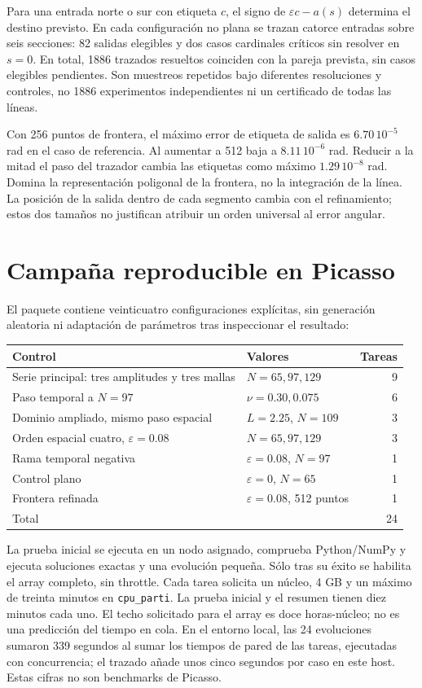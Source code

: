 \documentclass[11pt,a4paper]{article}
\newcommand{\eps}{\varepsilon}
\begin{document}
Para una entrada norte o sur con etiqueta $c$, el signo de $\eps c-a(s)$ determina el destino previsto. En cada configuración no plana se trazan catorce entradas sobre seis secciones: 82 salidas elegibles y dos casos cardinales críticos sin resolver en $s=0$. En total, 1886 trazados resueltos coinciden con la pareja prevista, sin casos elegibles pendientes. Son muestreos repetidos bajo diferentes resoluciones y controles, no 1886 experimentos independientes ni un certificado de todas las líneas.

Con 256 puntos de frontera, el máximo error de etiqueta de salida es $6.70\,10^{-5}$ rad en el caso de referencia. Al aumentar a 512 baja a $8.11\,10^{-6}$ rad. Reducir a la mitad el paso del trazador cambia las etiquetas como máximo $1.29\,10^{-8}$ rad. Domina la representación poligonal de la frontera, no la integración de la línea. La posición de la salida dentro de cada segmento cambia con el refinamiento; estos dos tamaños no justifican atribuir un orden universal al error angular.

\section{Campaña reproducible en Picasso}
El paquete contiene veinticuatro configuraciones explícitas, sin generación aleatoria ni adaptación de parámetros tras inspeccionar el resultado:
\begin{center}
\small\begin{tabular}{@{}p{.48\linewidth}p{.33\linewidth}r@{}}
\toprule
Control & Valores & Tareas\\
\midrule
Serie principal: tres amplitudes y tres mallas & $N=65,97,129$ & 9\\
Paso temporal a $N=97$ & $\nu=0.30,0.075$ & 6\\
Dominio ampliado, mismo paso espacial & $L=2.25$, $N=109$ & 3\\
Orden espacial cuatro, $\eps=0.08$ & $N=65,97,129$ & 3\\
Rama temporal negativa & $\eps=0.08$, $N=97$ & 1\\
Control plano & $\eps=0$, $N=65$ & 1\\
Frontera refinada & $\eps=0.08$, 512 puntos & 1\\
\midrule
Total & & 24\\
\bottomrule
\end{tabular}
\end{center}
La prueba inicial se ejecuta en un nodo asignado, comprueba Python/NumPy y ejecuta soluciones exactas y una evolución pequeña. Sólo tras su éxito se habilita el array completo, sin throttle. Cada tarea solicita un núcleo, 4 GB y un máximo de treinta minutos en \texttt{cpu\_parti}. La prueba inicial y el resumen tienen diez minutos cada uno. El techo solicitado para el array es doce horas-núcleo; no es una predicción del tiempo en cola. En el entorno local, las 24 evoluciones sumaron 339 segundos al sumar los tiempos de pared de las tareas, ejecutadas con concurrencia; el trazado añade unos cinco segundos por caso en este host. Estas cifras no son benchmarks de Picasso.
\end{document}

